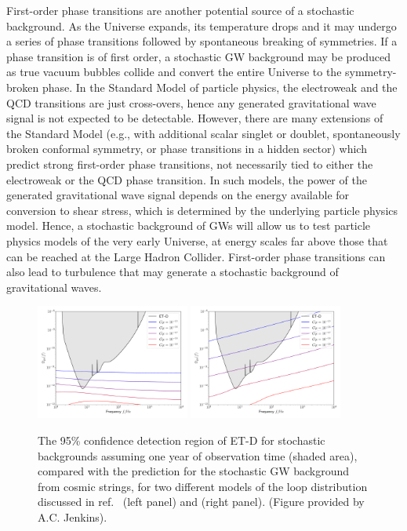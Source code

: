 First-order phase transitions are another potential source of  a stochastic background.
As the Universe expands, its temperature drops and it may undergo a series of phase transitions followed by spontaneous breaking of symmetries. If a phase transition is of first order, 
a  stochastic GW background may be produced as true vacuum bubbles collide and convert the entire Universe to the symmetry-broken phase.
In the Standard Model  of particle physics, the electroweak and the QCD  transitions are just  cross-overs, hence any generated gravitational wave signal is not expected to be detectable. However, there are many extensions of the Standard Model (e.g., with additional scalar singlet or doublet, spontaneously broken conformal symmetry, or phase transitions in a hidden sector) which predict strong first-order phase transitions, not necessarily tied to either the electroweak or the QCD phase transition. In such models, the power of the generated gravitational wave signal depends on the energy available for conversion to shear stress, which is determined by the underlying particle physics model. 
Hence, a stochastic background of GWs will allow us to test particle physics models of the very early Universe, at energy scales far above those  that can be reached at the Large Hadron Collider. 
First-order phase transitions can also lead to turbulence that may generate a stochastic background of gravitational waves.

\begin{figure}[t]
\includegraphics[width=0.45\textwidth]{Figures/sgwb-cs-3g-model-2.pdf}\quad
\includegraphics[width=0.45\textwidth]{Figures/sgwb-cs-3g-model-3.pdf}
\caption{The 95\% confidence detection region of ET-D for stochastic backgrounds  assuming  one year of observation time (shaded area), compared with the prediction for the stochastic GW background from cosmic strings, for  two different models of  the loop distribution discussed in ref.~\cite{Blanco-Pillado:2019nto} %
(left panel) 
and \cite{Lorenz:2010sm} 
(right panel). (Figure provided by A.C. Jenkins).  
\label{fig:sgwb-cs}}
\end{figure}

